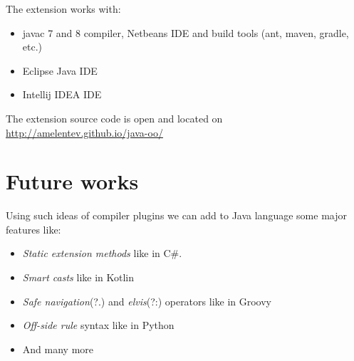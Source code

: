 \documentclass{aircc}
\begin{document}
The extension works with:
\begin{itemize}
\item javac 7 and 8 compiler, Netbeans IDE and build tools (ant, maven, gradle, etc.)
\item Eclipse Java IDE
\item Intellij IDEA IDE
\end{itemize}
The extension source code is open and located on \\ 
\url{http://amelentev.github.io/java-oo/}

\section{Future works}
Using such ideas of compiler plugins we can add to Java language some major features like:
\begin{itemize}
\item \textit{Static extension methods} like in C\#.
\item \textit{Smart casts} like in Kotlin\cite{smartcasts}
\item \textit{Safe navigation}(?.) and \textit{elvis}(?:) operators like in Groovy\cite{safenav}
\item \textit{Off-side rule}\cite{offsiderule} syntax like in Python
\item And many more
\end{itemize}



\end{document}
